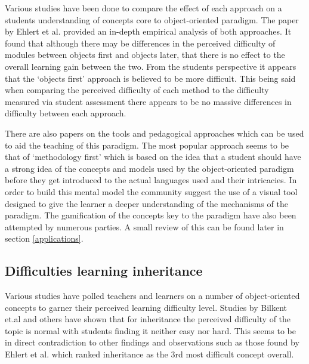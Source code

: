 \documentclass{l4proj}
\begin{document}
Various studies\cite{compOOPComfort,ehlert2007learners,empiricalOOP} have been done to compare the effect of each approach on a students understanding of concepts core to object-oriented paradigm. The paper by Ehlert et al. \cite{empiricalOOP} provided an in-depth empirical analysis of both approaches. It found that although there may be differences in the perceived difficulty of modules between objects first and objects later, that there is no effect to the overall learning gain between the two. From the students perspective it appears that the `objects first' approach is believed to be more difficult\cite{compOOPComfort,ehlert2007learners}. This being said when comparing the perceived difficulty of each method to the difficulty measured via student assessment there appears to be no massive differences in difficulty between each approach. 

There are also papers\cite{programmingInContext,methodologyFirst, 5070749, blowingThingsUp, toolsAndCollections, 6632635} on the tools and pedagogical approaches which can be used to aid the teaching of this paradigm. The most popular approach seems to be that of `methodology first' which is based on the idea that a student should have a strong idea of the concepts and models used by the object-oriented paradigm before they get introduced to the actual languages used and their intricacies. In order to build this mental model the community suggest the use of a visual tool designed to give the learner a deeper understanding of the mechanisms of the paradigm. The gamification of the concepts key to the paradigm have also been attempted by numerous parties. A small review of this can be found later in section \ref{applications}.



\subsection{Difficulties learning inheritance}

Various studies\cite{ehlert2007learners,compOOPComfort,dilatp} have polled teachers and learners on a number of object-oriented concepts to garner their perceived learning difficulty level. Studies by Bilkent et.al and others\cite{compOOPComfort,dilatp} have shown that for inheritance the perceived difficulty of the topic is normal with students finding it neither easy nor hard. This seems to be in direct contradiction to other findings and observations\cite{dilatp,partonomyAndTaxonomy,diffInheritancePolymorphism} such as those found by Ehlert et al.\cite{ehlert2007learners} which ranked inheritance as the 3rd most difficult concept overall. 
\end{document}
